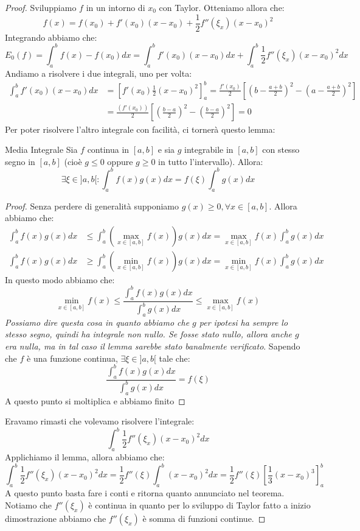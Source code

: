 \documentclass[11pt,a4paper,twoside]{article}
\theoremstyle{definition}
\begin{document}
\begin{proof}
	Sviluppiamo $f$ in un intorno di $x_0$ con Taylor. Otteniamo allora che:
	\[ f(x) = f(x_0) + f'(x_0)(x-x_0) + \frac 12 f''(\xi_x)(x-x_0)^2 \]
	Integrando abbiamo che:
	\[ E_0(f)= \int_a^b f(x) - f(x_0)dx = \int_a^b f'(x_0)(x-x_0)dx + \int_a^b\frac 12 f''(\xi_x)(x-x_0)^2dx \]
	Andiamo a risolvere i due integrali, uno per volta:
	\begin{align*}
		\int_a^b f'(x_0)(x-x_0)dx &= \left[ f'(x_0) \frac 12 (x-x_0)^2\right]_a^b = \frac{f'(x_0)}2 \left[ \left( b-\frac{a+b}2 \right)^2 - \left(a - \frac{a+b}2\right)^2 \right]\\
		&= \frac{(f'(x_0))}2 \left[\left( \frac{b-a}2 \right)^2 - \left( \frac{b-a}2 \right)^2\right] = 0
	\end{align*}
	Per poter risolvere l'altro integrale con facilità, ci tornerà questo lemma:
	\begin{lemma}{Media Integrale}{}\label{Media Integrale}
		Sia $f$ continua in $[a,b]$ e sia $g$ integrabile in $[a,b]$ con stesso segno in $[a,b]$ (cioè $g\leq 0$ oppure $g \geq 0$ in tutto l'intervallo). Allora:
		\[\exists \xi \in ]a,b[ : \int_a^b f(x)g(x)dx = f(\xi) \int_a^bg(x)dx\]
	\end{lemma}
	\begin{proof}
		Senza perdere di generalità supponiamo $g(x)\geq 0, \forall x \in [a,b]$. Allora abbiamo che:
		\begin{align*}
			\int_a^b f(x)g(x)dx &\leq \int_a^b \left(\max_{x \in [a,b]} f(x)\right)g(x)dx = \max_{x \in [a,b]} f(x) \int_a^b g(x)dx\\
			\int_a^b f(x)g(x)dx & \geq \int_a^b \left(\min_{x \in [a,b]}f(x)\right)g(x)dx = \min_{x \in [a,b]} f(x) \int_a^b g(x)dx
		\end{align*}
		In questo modo abbiamo che:
		\[ \min_{x \in [a,b]}f(x) \leq \frac{\displaystyle{\int_a^b f(x)g(x)dx}}{\displaystyle{\int_a^b g(x)dx}}\leq \max_{x \in [a,b]}f(x) \]
		\textit{Possiamo dire questa cosa in quanto abbiamo che $g$ per ipotesi ha sempre lo stesso segno, quindi ha integrale non nullo. Se fosse stato nullo, allora anche $g$ era nulla, ma in tal caso il lemma sarebbe stato banalmente verificato}. Sapendo che $f$ è una funzione continua, $\exists \xi \in ]a,b[$ tale che:
		\[ \frac{\displaystyle{\int_a^b f(x)g(x)dx}}{\displaystyle{\int_a^b g(x)dx}} = f(\xi) \]
		A questo punto si moltiplica e abbiamo finito
	\end{proof}
	Eravamo rimasti che volevamo risolvere l'integrale:
	\[ \int_a^b\frac 12 f''(\xi_x)(x-x_0)^2dx \]
	Applichiamo il lemma, allora abbiamo che:
	\[ \int_a^b\frac 12 f''(\xi_x)(x-x_0)^2dx = \frac 12 f''(\xi)\int_a^b(x-x_0)^2dx = \frac 12 f''(\xi)\left[ \frac 13(x-x_0)^3 \right]_a^b\]
	A questo punto basta fare i conti e ritorna quanto annunciato nel teorema.\\
	Notiamo che $f''(\xi_x)$ è continua in quanto per lo sviluppo di Taylor fatto a inizio dimostrazione abbiamo che $f''(\xi_x)$ è somma di funzioni continue.
\end{proof}
\end{document}
